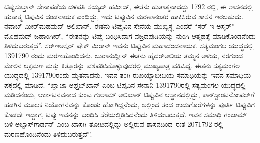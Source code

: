 ಟಿಪ್ಪುಸುಲ್ತಾನ್​ ಸೇನಾಪಡೆಯ ದಳಪತಿ ಸಯ್ಯದ್​ ಹಮೀದ್​, ಈತನು ಹುತಾತ್ಮನಾದದ್ದು 1792 ರಲ್ಲಿ, ಈ ಶಾಸನದಲ್ಲಿ ಹುತಾತ್ಮ ಟಿಪುವಿನ ದಂಡನಾಯಕ ಎಂದಿದ್ದು, ಇದು ಟಿಪ್ಪುವಿನ ಮರಣಾನಂತರ ಹಾಕಿಸಿರುವ ಶಾಸನ ಇರಬಹುದು. ನವಾಬ್​ ಮೀರ್​ಮಹಮದ್​ ಅಲಿಖಾನ್​, ಈತನು ಟಿಪ್ಪುವಿನ ಸೇನೆಯ ಮುಖ್ಯಸ್ಥ ಎಂದರೆ “ಸರ್​ ಇ ಅಸ್ಕರ್​” ಮೊಹಮದ್​ ಜಹಾಂಗೀರ್​, “ಈತನನ್ನು ಟಿಪ್ಪು ಬಂಧಿಸಿದಾಗ ವಜ್ರದಪುಡಿಯನ್ನು ನುಂಗಿ ಆತ್ಮಹತ್ಯೆ ಮಾಡಿಕೊಂಡನೆಂದು ತಿಳಿದು\-ಬರುತ್ತದೆ”. ಸರ್​ಇಅಸ್ಕರ್​ ಷೇಕ್​ ಮಿರಾನ್​ ಇವನು ಟಿಪ್ಪುವಿನ ಮಹಾದಂಡನಾಯಕ. ಸತ್ಯಮಂಗಲ ಯುದ್ಧದಲ್ಲಿ 1391790 ರಂದು ಮರಣಹೊಂದಿದನು. ಬುರಾನುದ್ದೀನ್​ ಈತನು ಹೈದರ್​ಅಲಿಯ ತಮ್ಮನ ಅಳಿಯ, ನರಗುಂದ ಮೇಲಿನ ಆಕ್ರಮಣ ಮತ್ತು ಕಿತ್ತೂರನ್ನು ವಶಪಡಿಸಿಕೊಳ್ಳುವುದರಲ್ಲಿ ಮುಖ್ಯಪಾತ್ರ ವಹಿಸಿದ್ದ. ಈತನು ಸತ್ಯಮಂಗಲ ಯುದ್ಧದಲ್ಲಿ 1391790ರಂದು ಮೃತನಾದನು. ಇವನ ತಂಗಿ ರುಖಯ್ಯಾಬೀಬಿಯ ಸಮಾಧಿಯನ್ನು ಇವನ ಸಮಾಧಿಯ ಪಕ್ಕದಲ್ಲಿ ಮಾಡಿದೆ. “ಖ್ವಾಜಾ ಅಫ್ತಬ್​ಖಾನ್​ ಎಂಬ ಟಿಪ್ಪವಿನ ಸೇನಾನಿ 1391790ರಲ್ಲಿ ಸತ್ಯಮಂಗಲ ಯುದ್ಧದಲ್ಲಿ ಮಡಿದನೆಂದು, ಆರ್ಕಾಟಿನವನಾದ ಕುಂಟ ಗುಲಾಮ್ ಅಲಿಖಾನ್​ ಟಿಪ್ಪುವಿನ ಆಸ್ಥಾನದಲ್ಲಿದ್ದು, ಕಾನ್​ಸ್ಟಾಂಟಿನೋಪಲ್​ಗೆ ಹಡಗಿನ ಮೂಲಕ ನಿಯೋಗನವನ್ನು ಕೊಂಡು ಹೋಗಿದ್ದನೆಂದು, ಅಲ್ಲಿಂದ ತಂದ ಉಡುಗೊರೆಗಳನ್ನು ಪೂರ್ತಿ ಟಿಪ್ಪುವಿಗ ಕೊಡದೇ ಇದ್ದಾಗ, ಟಿಪ್ಪು ಇವನನ್ನು ಬಂಧಿಸಿ ಸೆರೆಯಲ್ಲಿಡಿಸಿದನೆಂದು ತಿಳಿದುಬರುತ್ತದೆ. ಇವನ ಸಮಾಧಿ ಗಂಜಾಮ್ ಬಳಿ ಅಬ್ಬಾಸ್​ಗಾರ್ಡನ್​ ಎಂಬ ಖಾಸಗಿ ತೋಟದಲ್ಲಿದ್ದು ಅಲ್ಲಿರುವ ಶಾಸನದಿಂದ ಈತ 2071792 ರಲ್ಲಿ ಮರಣಹೊಂದಿನೆಂದು ತಿಳಿದುಬರುತ್ತದೆ”.

